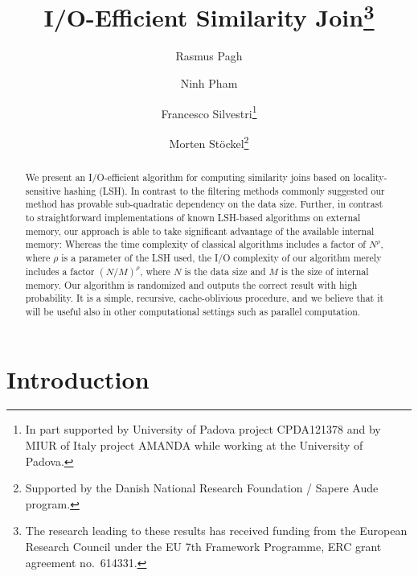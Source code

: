 \documentclass{llncs}
\begin{document}
\title{I/O-Efficient Similarity Join\thanks{The research leading to these results has received
funding from the European Research Council under the EU 7th Framework Programme, ERC grant agreement no.~614331.}}
\date{}

\author{Rasmus Pagh \and Ninh Pham \and Francesco Silvestri\thanks{In part supported by University of Padova project CPDA121378 and by MIUR of Italy project AMANDA while working at the University of Padova.} \and Morten St{\"o}ckel\thanks{Supported by the Danish National Research Foundation / Sapere Aude program.}}


\maketitle



\begin{abstract}

We present an I/O-efficient algorithm for computing similarity joins based on locality-sensitive hashing (LSH).
In contrast to the filtering methods commonly suggested our method has provable sub-quadratic dependency on the data size.
Further, in contrast to straightforward implementations of known LSH-based algorithms on external memory, our approach is able to take significant advantage of the available internal memory: Whereas the time complexity of classical algorithms includes a factor of $N^\rho$, where $\rho$ is a parameter of the LSH used, the I/O complexity of our algorithm merely includes a factor $(N/M)^\rho$, where $N$ is the data size and $M$ is the size of internal memory. 
Our algorithm is randomized and outputs the correct result with high probability.
It is a simple, recursive, cache-oblivious procedure, and we believe that it will be useful also in other computational settings such as parallel computation.

\end{abstract}




\section{Introduction}
\end{document}
